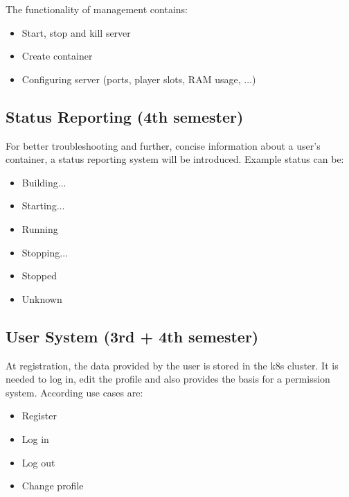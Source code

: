 \documentclass[a4paper,12pt,chapterprefix=false,bibliography=totoc,listof=totoc,]{scrreprt}
\begin{document}
 
The functionality of management contains:
\begin{itemize}
	\item Start, stop and kill server
	\item Create container
	\item Configuring server (ports, player slots, RAM usage, ...)
\end{itemize}

\subsection{Status Reporting (4th semester)}
For better troubleshooting and further, concise information about a user's container, a status reporting system will be introduced. Example status can be:
\begin{itemize}
	\item Building...
	\item Starting...
	\item Running
	\item Stopping...
	\item Stopped
	\item Unknown
\end{itemize}


\subsection{User System (3rd + 4th semester)}
At registration, the data provided by the user is stored in the \gls{k8s} cluster. It is needed to log in, edit the profile and also provides the basis for a permission system. According use cases are:

\begin{itemize}
	\item Register
	\item Log in
	\item Log out
	\item Change profile
\end{itemize}
\end{document}
